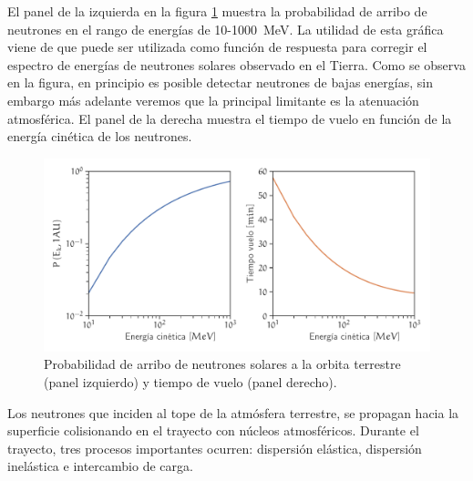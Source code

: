 El panel de la izquierda en la figura \ref{fig:neutron-prob} muestra la probabilidad de arribo de neutrones en el rango de energías de \num{10}-\SI{1000}{\mega\electronvolt}. La utilidad de esta gráfica viene de que puede ser utilizada como función de respuesta para corregir el espectro de energías de neutrones solares observado en el Tierra. Como se observa en la figura, en principio es posible detectar neutrones de bajas energías, sin embargo más adelante veremos que la principal limitante es la atenuación atmosférica. El panel de la derecha muestra el tiempo de vuelo en función de la energía cinética de los neutrones.

\begin{figure}
        \centering
        \includegraphics[width=\textwidth]{neutron-prob.pdf}
        \caption{Probabilidad de arribo de neutrones solares a la orbita terrestre (panel izquierdo) y tiempo de vuelo (panel derecho).}
        \label{fig:neutron-prob}
\end{figure}

Los neutrones que inciden al tope de la atmósfera terrestre, se propagan hacia la superficie colisionando en el trayecto con núcleos atmosféricos. Durante el trayecto, tres procesos importantes ocurren: dispersión elástica, dispersión inelástica e intercambio de carga.

